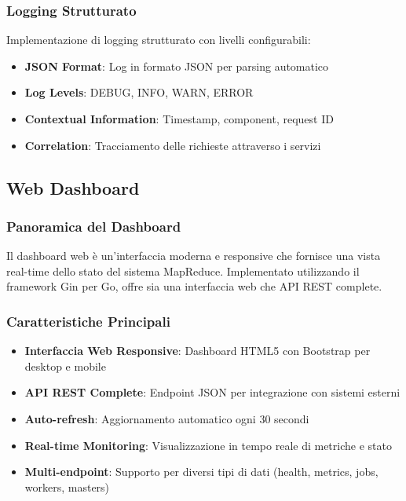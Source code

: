 \documentclass[12pt,a4paper]{article}
\begin{document}
\subsubsection{Logging Strutturato}

Implementazione di logging strutturato con livelli configurabili:

\begin{itemize}
\item \textbf{JSON Format}: Log in formato JSON per parsing automatico
\item \textbf{Log Levels}: DEBUG, INFO, WARN, ERROR
\item \textbf{Contextual Information}: Timestamp, component, request ID
\item \textbf{Correlation}: Tracciamento delle richieste attraverso i servizi
\end{itemize}

\subsection{Web Dashboard}

\subsubsection{Panoramica del Dashboard}

Il dashboard web è un'interfaccia moderna e responsive che fornisce una vista real-time dello stato del sistema MapReduce. Implementato utilizzando il framework Gin per Go, offre sia una interfaccia web che API REST complete.

\subsubsection{Caratteristiche Principali}

\begin{itemize}
\item \textbf{Interfaccia Web Responsive}: Dashboard HTML5 con Bootstrap per desktop e mobile
\item \textbf{API REST Complete}: Endpoint JSON per integrazione con sistemi esterni
\item \textbf{Auto-refresh}: Aggiornamento automatico ogni 30 secondi
\item \textbf{Real-time Monitoring}: Visualizzazione in tempo reale di metriche e stato
\item \textbf{Multi-endpoint}: Supporto per diversi tipi di dati (health, metrics, jobs, workers, masters)
\end{itemize}
\end{document}

